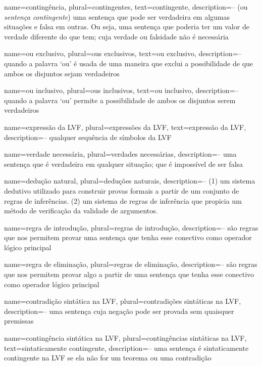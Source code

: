 {
 name=contingência,
 plural=contingentes,
 text=contingente,
 description={-- (ou \textit{sentença contingente}) uma sentença que pode ser verdadeira em algumas situações e falsa em outras. Ou seja, uma sentença que poderia ter um valor de verdade diferente do que tem; cuja verdade ou falsidade não é necessária}
}

{
 name=ou exclusivo,
 plural=ous exclusivos,
 text=ou exclusivo,
 description={-- quando a palavra `ou' é usada de uma maneira que exclui a
possibilidade de que ambos os disjuntos sejam verdadeiros}
}

{
 name=ou inclusivo,
 plural=ous inclusivos,
 text=ou inclusivo,
 description={-- quando a palavra `ou' permite a possibilidade de ambos os disjuntos
serem verdadeiros}
}

{
 name=expressão da LVF,
 plural=expressões da LVF,
 text=expressão da LVF,
 description={-- qualquer sequência de símbolos da LVF}
}

{
 name={verdade necessária},
 plural={verdades necessárias},
 description={-- uma sentença que é verdadeira em qualquer situação; que é impossível de ser falsa}
}

{
 name={dedução natural},
 plural={deduções naturais},
 description={-- (1) um sistema dedutivo utilizado para construir provas formais a partir de um conjunto de regras de inferências. (2) um sistema de regras de inferência que propicia um método de verificação da validade de argumentos.}
}

{
 name={regra de introdução},
 plural={regras de introdução},
 description={-- são regras que nos permitem provar uma sentença que tenha esse conectivo como operador lógico principal}
}

{
 name={regra de eliminação},
 plural={regras de eliminação},
 description={-- são regras que nos permitem provar algo a partir de uma
sentença que tenha esse conectivo como operador lógico principal}
}

{
 name={contradição sintática na LVF},
 plural={contradições sintáticas na LVF},
 description={-- uma sentença cuja negação pode ser provada sem quaisquer premissas}
}

{
 name={contingência sintática na LVF},
 plural={contingências sintáticas na LVF},
 text={sintaticamente contingente},
 description={-- uma sentença é sintaticamente contingente na LVF se ela não for um teorema ou uma contradição}
}

